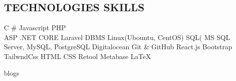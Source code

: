 \documentclass[]{main}
\begin{document}
\begin{minipage}[t]{0.33\textwidth}
\subsection{TECHNOLOGIES SKILLS}
\vspace{\topsep}
C \# \textbullet{}   Javascript \textbullet{} PHP \\ 
\vspace{\topsep}
ASP .NET CORE \textbullet{} Laravel \textbullet{} DBMS \textbullet{} Linux(Ubountu, CentOS) \textbullet{} SQL( MS SQL Server, MySQL, PostgreSQL  \textbullet{} Digitalocean  \textbullet{} Git \& GitHub \textbullet{} React.js \textbullet{} Bootstrap \textbullet{} TailwndCss \textbullet{} HTML \textbullet{} CSS \textbullet{} Retool \textbullet{} Metabase \textbullet{} \LaTeX 

\sectionsep

blogs

%
%

\end{minipage} 
\hfill
\end{document}
